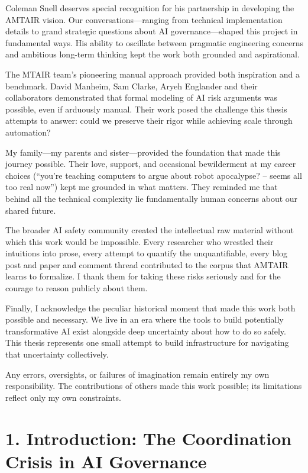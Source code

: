 \documentclass[
  11pt,
  letterpaper,
  openany]{book}
\begin{document}
Coleman Snell deserves special recognition for his partnership in
developing the AMTAIR vision. Our conversations---ranging from technical
implementation details to grand strategic questions about AI
governance---shaped this project in fundamental ways. His ability to
oscillate between pragmatic engineering concerns and ambitious long-term
thinking kept the work both grounded and aspirational.

The MTAIR team's pioneering manual approach provided both inspiration
and a benchmark. David Manheim, Sam Clarke, Aryeh Englander and their
collaborators demonstrated that formal modeling of AI risk arguments was
possible, even if arduously manual. Their work posed the challenge this
thesis attempts to answer: could we preserve their rigor while achieving
scale through automation?

My family---my parents and sister---provided the foundation that made
this journey possible. Their love, support, and occasional bewilderment
at my career choices (``you're teaching computers to argue about robot
apocalypse? -- seems all too real now'') kept me grounded in what
matters. They reminded me that behind all the technical complexity lie
fundamentally human concerns about our shared future.

The broader AI safety community created the intellectual raw material
without which this work would be impossible. Every researcher who
wrestled their intuitions into prose, every attempt to quantify the
unquantifiable, every blog post and paper and comment thread contributed
to the corpus that AMTAIR learns to formalize. I thank them for taking
these risks seriously and for the courage to reason publicly about them.

Finally, I acknowledge the peculiar historical moment that made this
work both possible and necessary. We live in an era where the tools to
build potentially transformative AI exist alongside deep uncertainty
about how to do so safely. This thesis represents one small attempt to
build infrastructure for navigating that uncertainty collectively.

Any errors, oversights, or failures of imagination remain entirely my
own responsibility. The contributions of others made this work possible;
its limitations reflect only my own constraints.


\chapter{1. Introduction: The Coordination Crisis in AI
Governance}\label{introduction-the-coordination-crisis-in-ai-governance}
\end{document}
